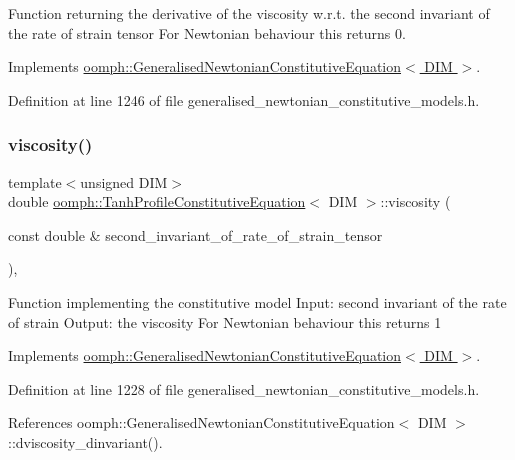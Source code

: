 Function returning the derivative of the viscosity w.\+r.\+t. the second invariant of the rate of strain tensor For Newtonian behaviour this returns 0. 

Implements \hyperlink{classoomph_1_1GeneralisedNewtonianConstitutiveEquation_ad0164e6ca57cc986048346e12c4d353a}{oomph\+::\+Generalised\+Newtonian\+Constitutive\+Equation$<$ D\+I\+M $>$}.



Definition at line 1246 of file generalised\+\_\+newtonian\+\_\+constitutive\+\_\+models.\+h.

\mbox{\label{classoomph_1_1TanhProfileConstitutiveEquation_aee5659a24ab4d18f4a90661113528ca3}} 
\subsubsection{\texorpdfstring{viscosity()}{viscosity()}}
{\footnotesize\ttfamily template$<$unsigned D\+IM$>$ \\
double \hyperlink{classoomph_1_1TanhProfileConstitutiveEquation}{oomph\+::\+Tanh\+Profile\+Constitutive\+Equation}$<$ D\+IM $>$\+::viscosity (\begin{DoxyParamCaption}\item[{const double \&}]{second\+\_\+invariant\+\_\+of\+\_\+rate\+\_\+of\+\_\+strain\+\_\+tensor }\end{DoxyParamCaption})\hspace{0.3cm}{\ttfamily [inline]}, {\ttfamily [virtual]}}

Function implementing the constitutive model Input\+: second invariant of the rate of strain Output\+: the viscosity For Newtonian behaviour this returns 1 

Implements \hyperlink{classoomph_1_1GeneralisedNewtonianConstitutiveEquation_a3e6d811786e39ca3c3a9b1c46249442f}{oomph\+::\+Generalised\+Newtonian\+Constitutive\+Equation$<$ D\+I\+M $>$}.



Definition at line 1228 of file generalised\+\_\+newtonian\+\_\+constitutive\+\_\+models.\+h.



References oomph\+::\+Generalised\+Newtonian\+Constitutive\+Equation$<$ D\+I\+M $>$\+::dviscosity\+\_\+dinvariant().



